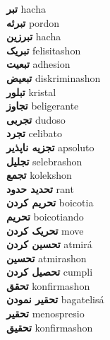 \textbf{ تبر  } hacha \\
\textbf{ تبرئه  } pordon \\
\textbf{ تبرزین  } hacha \\
\textbf{ تبریک  } felisitashon \\
\textbf{ تبعیت  } adhesion \\
\textbf{ تبعیض  } diskriminashon \\
\textbf{ تبلور  } kristal \\
\textbf{ تجاوز  } beligerante \\
\textbf{ تجربی  } dudoso \\
\textbf{ تجرد  } celibato \\
\textbf{ تجزیه ناپذیر  } apsoluto \\
\textbf{ تجلیل  } selebrashon \\
\textbf{ تجمع  } kolekshon \\
\textbf{ تحدید حدود  } rant \\
\textbf{ تحریم کردن  } boicotia \\
\textbf{ تحریم  } boicotiando \\
\textbf{ تحریک کردن  } move \\
\textbf{ تحسین کردن  } atmirá \\
\textbf{ تحسین  } atmirashon \\
\textbf{ تحصیل کردن  } cumpli \\
\textbf{ تحقق  } konfirmashon \\
\textbf{ تحقیر نمودن  } bagatelisá \\
\textbf{ تحقیر  } menospresio \\
\textbf{ تحقیق  } konfirmashon \\
